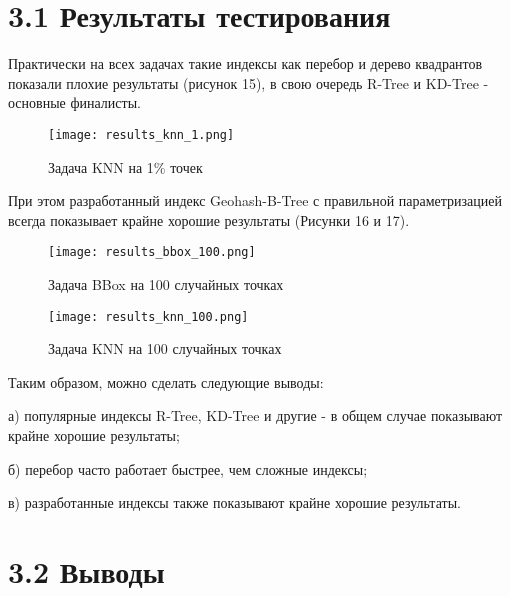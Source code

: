 \vspace{-2em}
\section{3.1 Результаты тестирования}

Практически на всех задачах такие индексы как перебор и дерево квадрантов показали плохие результаты (рисунок 15), в свою очередь R-Tree и KD-Tree - основные финалисты. 
  \\
\begin{figure}[h]
    \centering
    \texttt{[image: results\_knn\_1.png]}
    \caption{Задача KNN на 1\% точек}
\end{figure}

При этом разработанный индекс Geohash-B-Tree с правильной параметризацией всегда показывает крайне хорошие результаты (Рисунки 16 и 17).
\par\vspace{1em}
\begin{figure}[H]
    \centering
    \texttt{[image: results\_bbox\_100.png]}
    \caption{Задача BBox на 100 случайных точках}
\end{figure}
\par\vspace{1em}
\begin{figure}[H]
    \centering
    \texttt{[image: results\_knn\_100.png]}
    \caption{Задача KNN на 100 случайных точках}
\end{figure}
\par\vspace{1em}

\begin{samepage}
    Таким образом, можно сделать следующие выводы:
    \par а) популярные индексы R-Tree, KD-Tree и другие - в общем случае показывают крайне хорошие результаты;
    \par б) перебор часто работает быстрее, чем сложные индексы;
    \par в) разработанные индексы также показывают крайне хорошие результаты.
\end{samepage}

\section{3.2 Выводы}

